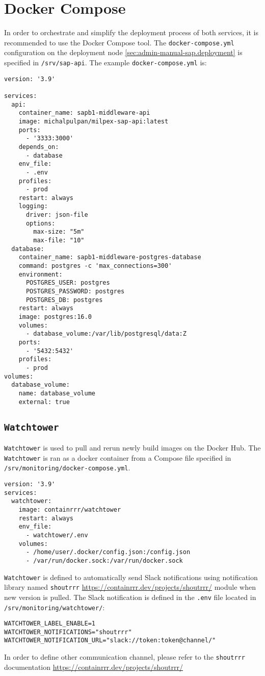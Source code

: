 \section{Docker Compose}
In order to orchestrate and simplify the deployment process of both services, it is recommended to use the Docker Compose tool.
The \texttt{docker-compose.yml} configuration on the deployment node \ref{sec:admin-manual-sap.deployment} is specified in \texttt{/srv/sap-api}.
The example \texttt{docker-compose.yml} is:
\begin{lstlisting}[caption={SAP Business One ServiceLayer Proxy with database connector \texttt{docker-compose.yml}}]
version: '3.9'

services:
  api:
    container_name: sapb1-middleware-api
    image: michalpulpan/milpex-sap-api:latest
    ports:
      - '3333:3000'
    depends_on:
      - database
    env_file:
      - .env
    profiles:
      - prod
    restart: always
    logging:
      driver: json-file
      options:
        max-size: "5m"
        max-file: "10"
  database:
    container_name: sapb1-middleware-postgres-database
    command: postgres -c 'max_connections=300'
    environment:
      POSTGRES_USER: postgres
      POSTGRES_PASSWORD: postgres
      POSTGRES_DB: postgres
    restart: always
    image: postgres:16.0
    volumes:
      - database_volume:/var/lib/postgresql/data:Z
    ports:
      - '5432:5432'
    profiles:
      - prod
volumes:
  database_volume:
    name: database_volume
    external: true
\end{lstlisting}

\subsection{\texttt{Watchtower}}
\texttt{Watchtower} is used to pull and rerun newly build images on the Docker Hub.
The \texttt{Watchtower} is ran as a docker container from a Compose file specified in \texttt{/srv/monitoring/docker-compose.yml}.

\begin{lstlisting}[caption={Watchtower \texttt{docker-compose.yml}}]
version: '3.9'
services:
  watchtower:
    image: containrrr/watchtower
    restart: always
    env_file:
      - watchtower/.env
    volumes:
      - /home/user/.docker/config.json:/config.json
      - /var/run/docker.sock:/var/run/docker.sock
\end{lstlisting}

\texttt{Watchtower} is defined to automatically send Slack notifications using notification library named \texttt{shoutrrr} \url{https://containrrr.dev/projects/shoutrrr/} module when new version is pulled. The Slack notification is defined in the \texttt{.env} file located in \texttt{/srv/monitoring/watchtower/}:
\begin{lstlisting}[caption={Watchtower environment variables}]
WATCHTOWER_LABEL_ENABLE=1
WATCHTOWER_NOTIFICATIONS="shoutrrr"
WATCHTOWER_NOTIFICATION_URL="slack://token:token@channel/"
\end{lstlisting}
In order to define other communication channel, please refer to the \texttt{shoutrrr} documentation \url{https://containrrr.dev/projects/shoutrrr/}

